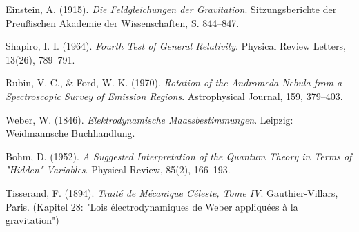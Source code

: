 \documentclass[10pt,oneside,openright]{book} %
\numberwithin{equation}{section}
\begin{document}
\begin{thebibliography}{9}

Einstein, A. (1915). 
\textit{Die Feldgleichungen der Gravitation}. 
Sitzungsberichte der Preußischen Akademie der Wissenschaften, 
S. 844–847.

Shapiro, I. I. (1964). 
\textit{Fourth Test of General Relativity}. 
Physical Review Letters, 13(26), 789–791.

Rubin, V. C., \& Ford, W. K. (1970). 
\textit{Rotation of the Andromeda Nebula from a Spectroscopic Survey of Emission Regions}. 
Astrophysical Journal, 159, 379–403.

Weber, W. (1846). 
\textit{Elektrodynamische Maassbestimmungen}. 
Leipzig: Weidmannsche Buchhandlung.

Bohm, D. (1952). 
\textit{A Suggested Interpretation of the Quantum Theory in Terms of "Hidden" Variables}. 
Physical Review, 85(2), 166–193.

Tisserand, F. (1894). 
\textit{Traité de Mécanique Céleste, Tome IV}. 
Gauthier-Villars, Paris. 
(Kapitel 28: "Lois électrodynamiques de Weber appliquées à la gravitation")

\end{thebibliography}
\end{document}

